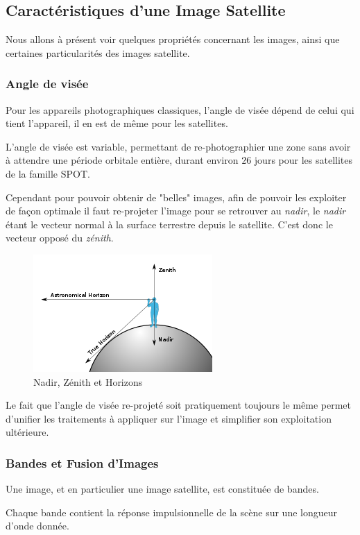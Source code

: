 \documentclass[a4paper, 11pt]{report}
\begin{document}
\subsection{Caractéristiques d'une Image Satellite}
Nous allons à présent voir quelques propriétés concernant les images, ainsi que certaines particularités des images satellite.
\subsubsection{Angle de visée}
Pour les appareils photographiques classiques, l'angle de visée dépend de celui qui tient l'appareil, il en est de même pour les satellites. 

L'angle de visée est variable, permettant de re-photographier une zone sans avoir à attendre une période orbitale entière, durant environ $26$ jours pour les satellites de la famille SPOT.

Cependant pour pouvoir obtenir de "belles" images, afin de pouvoir les exploiter de façon optimale il faut re-projeter l'image pour se retrouver au \emph{nadir}, le \emph{nadir} étant le vecteur normal à la surface terrestre depuis le satellite. C'est donc le vecteur opposé du \emph{zénith}.
\begin{figure}[H]
	\begin{center}
		\includegraphics[scale=0.9]{Images/Nadir.png}
		\caption{Nadir, Zénith et Horizons}
	\end{center}
\end{figure}

Le fait que l'angle de visée re-projeté soit pratiquement toujours le même permet d'unifier les traitements à appliquer sur l'image et simplifier son exploitation ultérieure.
\subsubsection{Bandes et Fusion d'Images}
Une image, et en particulier une image satellite, est constituée de bandes. 

Chaque bande contient la réponse impulsionnelle de la scène sur une longueur d'onde donnée.
\end{document}
